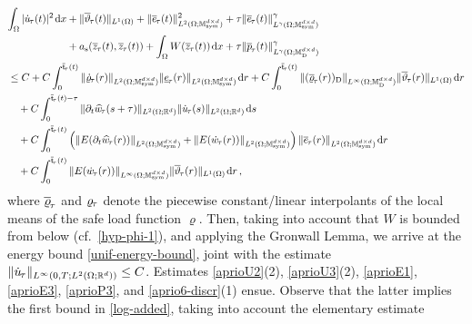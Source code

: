 \documentclass[a4paper,10pt,reqno]{amsart}
\numberwithin{equation}{section}
\newcommand{\bbM}{\mathbb{M}}
\newcommand{\R}{\mathbb{R}}
\numberwithin{equation}{section}
\def\dd{\;\!\mathrm{d}} %
\newcommand{\teta}{\vartheta}
\newcommand{\piecewiseConstant}[2]{\overline{#1}_{\kern-1pt#2}}
\newcommand{\pwc}{\piecewiseConstant}
\newcommand{\upiecewiseConstant}[2]{\underline{#1}_{\kern-1pt#2}}
\newcommand{\upwc}{\upiecewiseConstant}
\newcommand{\piecewiseLinear}[2]{{#1}_{\kern-1pt#2}}
\newcommand{\pwl}{\piecewiseLinear}
\newcommand{\pwwll}[2]{\widehat{#1}_{\kern-1pt#2}}
\newcommand{\sig}[1]{E(#1)}
\newcommand{\mt}{\bbM}
\newcommand{\sym}{\mathrm{sym}}
\newcommand{\dev}{\mathrm{D}}
\newcommand{\ass}{a_{\mathrm{s}}}
\newcommand{\MMM}{\color{black}}%
\begin{document}
\begin{equation}
\label{very1calc}
\begin{aligned}
&
\begin{aligned}
\int_\Omega | \pwl{\dot u}\tau (t)|^2 \dd x &  +  \| \pwc\teta\tau(t)\|_{L^1(\Omega)} +   \| \pwc e\tau(t)\|_{L^2(\Omega;\mt_\sym^{d\times d})}^2  + \tau
\| \pwc e\tau(t)\|_{L^\gamma(\Omega;\mt_\sym^{d\times d})}^\gamma 
\\
& 
+ \ass (\pwc z \tau(t), \pwc z\tau(t)) + \int_\Omega W(\pwc z \tau(t)) \dd x 
+
  \tau 
\| \pwc p\tau(t)\|_{L^\gamma(\Omega;\mt_\dev^{d\times d})}^\gamma
\end{aligned}
\\ & 
  \leq   C + 
C  \int_{0}^{\pwc{\mathsf{t}}{\tau}(t)}   \|  \pwl{\dot \varrho}\tau (r)  \|_{L^2(\Omega;\mt_\sym^{d\times d})}  \|   \upwc e{\tau}(r)\|_{L^2(\Omega;\mt_\sym^{d\times d})} \dd r +
  C  \int_{0}^{\pwc{\mathsf{t}}{\tau}(t)}  \| (\pwc \varrho\tau (r))_\dev \|_{L^\infty (\Omega;\mt_\dev^{d\times d})} \| \pwc \teta\tau(r) \|_{L^1(\Omega)} \dd r\\ & 
  \quad 
+  C  \int_{0}^{\pwc{\mathsf{t}}{\tau}(t)-\tau}   \|  \partial_t\pwwll{w}\tau(s+\tau) \|_{L^2(\Omega;\R^d)}  \|  \pwl{\dot u}\tau(s) \|_{L^2(\Omega;\R^d)}   \dd  s 
\\ &  \quad 
+  C   \int_{0}^{\pwc{\mathsf{t}}{\tau}(t)    }   \left( \| \sig{\partial_t \pwwll w\tau(r)}\|_{L^2(\Omega;\mt_\sym^{d\times d}) }+   \|  \sig{\pwl{\dot w}\tau (r) }   \|_{L^2(\Omega;\mt_\sym^{d\times d}) } \right)    \| \pwc e\tau(r) \|_{L^2(\Omega;\mt_\sym^{d\times d}) }  \dd r \\ & \quad+   C   \int_{0}^{\pwc{\mathsf{t}}{\tau}(t)}  \|   \sig{\pwl{\dot w}\tau (r) } \|_{L^\infty (\Omega;\mt_\sym^{d\times d})} \| \pwc\teta\tau(r) \|_{L^1(\Omega)}  \dd r  \,,
\end{aligned}
\end{equation}
where $\pwc \varrho\tau$ and  $\pwl \varrho\tau$ denote the piecewise constant/linear interpolants of the local means of the safe load function $\varrho$. 
Then, taking into account that  $W$ is bounded from below (cf.\ \eqref{hyp-phi-1}),  and applying  the Gronwall Lemma, we arrive at the energy bound \eqref{unif-energy-bound}, joint with the estimate
$\|\pwl{\dot u}\tau \|_{L^\infty(0,T; L^2(\Omega;\R^d))} \leq C$. 
Estimates \eqref{aprioU2}(2), \eqref{aprioU3}(2),   
  \eqref{aprioE1}, \eqref{aprioE3}, \eqref{aprioP3}, and  \eqref{aprio6-discr}(1) ensue.
  Observe that the latter implies the first bound in \eqref{log-added}, \MMM taking into account the elementary estimate
\end{document}
